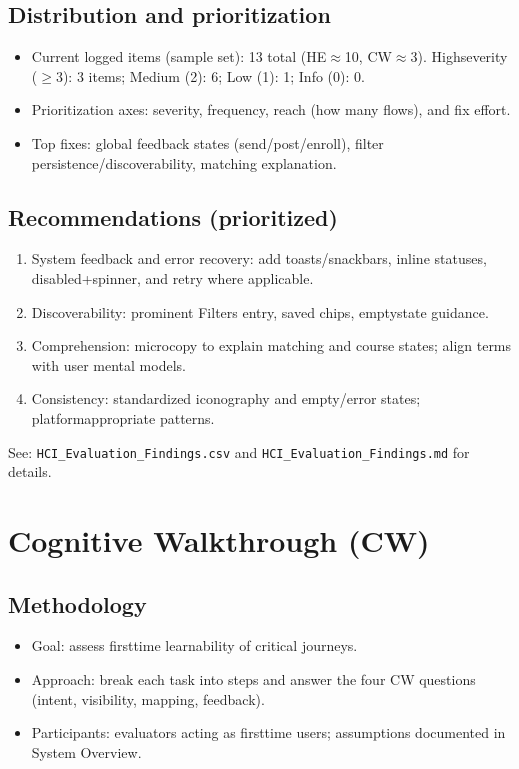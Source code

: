 \documentclass[11pt,a4paper]{article}
\begin{document}
\subsection{Distribution and prioritization}
\begin{itemize}[leftmargin=*]
  \item Current logged items (sample set): 13 total (HE$\approx$10, CW$\approx$3). High\-severity ($\geq$3): 3 items; Medium (2): 6; Low (1): 1; Info (0): 0.
  \item Prioritization axes: severity, frequency, reach (how many flows), and fix effort.
  \item Top fixes: global feedback states (send/post/enroll), filter persistence/discoverability, matching explanation.
\end{itemize}

\subsection{Recommendations (prioritized)}
\begin{enumerate}[leftmargin=*]
  \item System feedback and error recovery: add toasts/snackbars, inline statuses, disabled+spinner, and retry where applicable.
  \item Discoverability: prominent Filters entry, saved chips, empty\-state guidance.
  \item Comprehension: micro\-copy to explain matching and course states; align terms with user mental models.
  \item Consistency: standardized iconography and empty/error states; platform\-appropriate patterns.
\end{enumerate}

See: \texttt{HCI\_Evaluation\_Findings.csv} and \texttt{HCI\_Evaluation\_Findings.md} for details.

\section{Cognitive Walkthrough (CW)}

\subsection{Methodology}
\begin{itemize}[leftmargin=*]
  \item Goal: assess first\-time learnability of critical journeys.
  \item Approach: break each task into steps and answer the four CW questions (intent, visibility, mapping, feedback).
  \item Participants: evaluators acting as first\-time users; assumptions documented in System Overview.
\end{itemize}
\end{document}
